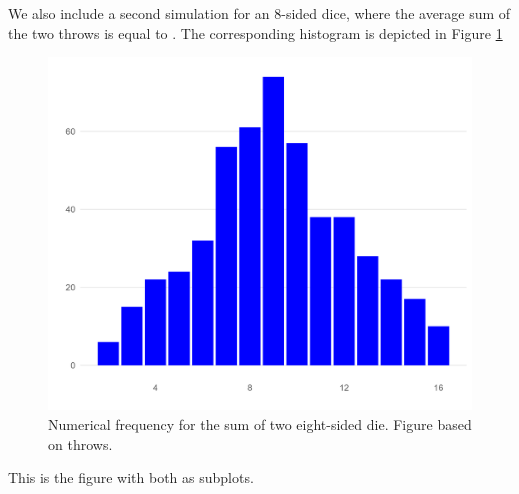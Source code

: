 \documentclass[12pt]{article}
\theoremstyle{definition}
\begin{document}
We also include a second simulation for an 8-sided dice, where the average sum of the two throws is equal to \unskip. The corresponding histogram is depicted in Figure \ref{fig:hist_500_8} 
\begin{figure}[tbh!]
\centering
\includegraphics[width=.8\linewidth]{plot/500_8/hist.png}
\caption[]{Numerical frequency for the sum of two eight-sided die. Figure based on throws.}
\label{fig:hist_500_8}
\end{figure}

\newpage

This is the figure with both as subplots. 
\end{document}

